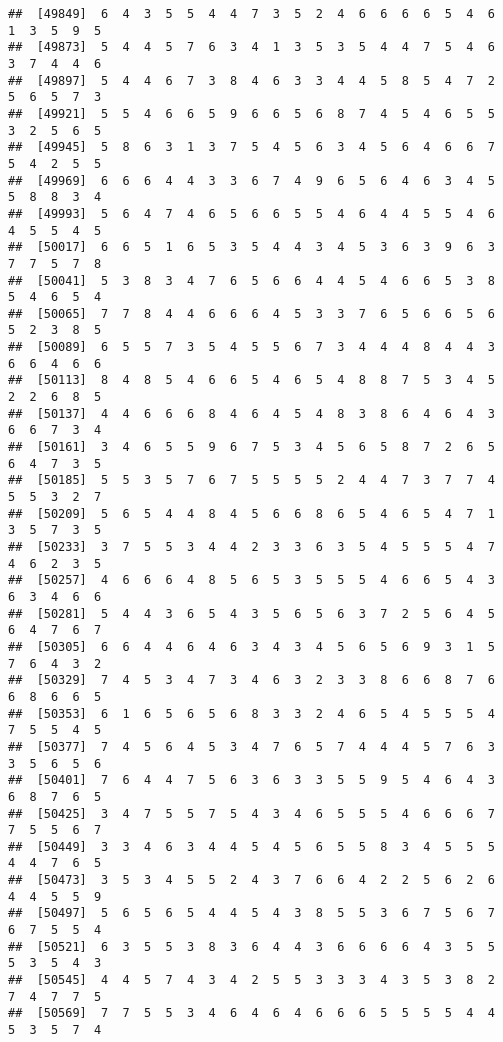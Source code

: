 \documentclass[
]{book}
\begin{document}
\begin{verbatim}
##  [49849]  6  4  3  5  5  4  4  7  3  5  2  4  6  6  6  6  5  4  6  1  3  5  9  5
##  [49873]  5  4  4  5  7  6  3  4  1  3  5  3  5  4  4  7  5  4  6  3  7  4  4  6
##  [49897]  5  4  4  6  7  3  8  4  6  3  3  4  4  5  8  5  4  7  2  5  6  5  7  3
##  [49921]  5  5  4  6  6  5  9  6  6  5  6  8  7  4  5  4  6  5  5  3  2  5  6  5
##  [49945]  5  8  6  3  1  3  7  5  4  5  6  3  4  5  6  4  6  6  7  5  4  2  5  5
##  [49969]  6  6  6  4  4  3  3  6  7  4  9  6  5  6  4  6  3  4  5  5  8  8  3  4
##  [49993]  5  6  4  7  4  6  5  6  6  5  5  4  6  4  4  5  5  4  6  4  5  5  4  5
##  [50017]  6  6  5  1  6  5  3  5  4  4  3  4  5  3  6  3  9  6  3  7  7  5  7  8
##  [50041]  5  3  8  3  4  7  6  5  6  6  4  4  5  4  6  6  5  3  8  5  4  6  5  4
##  [50065]  7  7  8  4  4  6  6  6  4  5  3  3  7  6  5  6  6  5  6  5  2  3  8  5
##  [50089]  6  5  5  7  3  5  4  5  5  6  7  3  4  4  4  8  4  4  3  6  6  4  6  6
##  [50113]  8  4  8  5  4  6  6  5  4  6  5  4  8  8  7  5  3  4  5  2  2  6  8  5
##  [50137]  4  4  6  6  6  8  4  6  4  5  4  8  3  8  6  4  6  4  3  6  6  7  3  4
##  [50161]  3  4  6  5  5  9  6  7  5  3  4  5  6  5  8  7  2  6  5  6  4  7  3  5
##  [50185]  5  5  3  5  7  6  7  5  5  5  5  2  4  4  7  3  7  7  4  5  5  3  2  7
##  [50209]  5  6  5  4  4  8  4  5  6  6  8  6  5  4  6  5  4  7  1  3  5  7  3  5
##  [50233]  3  7  5  5  3  4  4  2  3  3  6  3  5  4  5  5  5  4  7  4  6  2  3  5
##  [50257]  4  6  6  6  4  8  5  6  5  3  5  5  5  4  6  6  5  4  3  6  3  4  6  6
##  [50281]  5  4  4  3  6  5  4  3  5  6  5  6  3  7  2  5  6  4  5  6  4  7  6  7
##  [50305]  6  6  4  4  6  4  6  3  4  3  4  5  6  5  6  9  3  1  5  7  6  4  3  2
##  [50329]  7  4  5  3  4  7  3  4  6  3  2  3  3  8  6  6  8  7  6  6  8  6  6  5
##  [50353]  6  1  6  5  6  5  6  8  3  3  2  4  6  5  4  5  5  5  4  7  5  5  4  5
##  [50377]  7  4  5  6  4  5  3  4  7  6  5  7  4  4  4  5  7  6  3  3  5  6  5  6
##  [50401]  7  6  4  4  7  5  6  3  6  3  3  5  5  9  5  4  6  4  3  6  8  7  6  5
##  [50425]  3  4  7  5  5  7  5  4  3  4  6  5  5  5  4  6  6  6  7  7  5  5  6  7
##  [50449]  3  3  4  6  3  4  4  5  4  5  6  5  5  8  3  4  5  5  5  4  4  7  6  5
##  [50473]  3  5  3  4  5  5  2  4  3  7  6  6  4  2  2  5  6  2  6  4  4  5  5  9
##  [50497]  5  6  5  6  5  4  4  5  4  3  8  5  5  3  6  7  5  6  7  6  7  5  5  4
##  [50521]  6  3  5  5  3  8  3  6  4  4  3  6  6  6  6  4  3  5  5  5  3  5  4  3
##  [50545]  4  4  5  7  4  3  4  2  5  5  3  3  3  4  3  5  3  8  2  7  4  7  7  5
##  [50569]  7  7  5  5  3  4  6  4  6  4  6  6  6  5  5  5  5  4  4  5  3  5  7  4

\end{verbatim}
\end{document}
